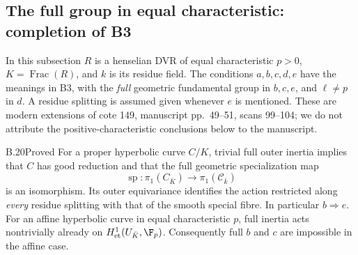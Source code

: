 \subsection{The full group in equal characteristic: completion of B3}

In this subsection $R$ is a henselian DVR of equal characteristic $p>0$,
$K=\operatorname{Frac}(R)$, and $k$ is its residue field. The conditions
$a,b,c,d,e$ have the meanings in B3, with the \emph{full} geometric
fundamental group in $b,c,e$, and $\ell\ne p$ in $d$. A residue splitting
is assumed given whenever $e$ is mentioned. These are modern extensions
of cote 149, manuscript pp.~49--51, scans 99--104; we do not attribute
the positive-characteristic conclusions below to the manuscript.

\begin{claim}{B.20}{Proved}
For a proper hyperbolic curve $C/K$, trivial full outer inertia implies
that $C$ has good reduction and that the full geometric specialization map
\[
 \operatorname{sp}:\pi_1(C_{\bar K})\longrightarrow
                  \pi_1(\mathcal C_{\bar k})
\]
is an isomorphism. Its outer equivariance identifies the action restricted
along \emph{every} residue splitting with that of the smooth special
fibre. In particular $b\Rightarrow e$.
For an affine hyperbolic curve in equal characteristic $p$, full inertia
acts nontrivially already on $H^1_{\mathrm{et}}(U_{\bar K},\F_p)$.
Consequently full $b$ and $c$ are impossible in the affine case.
\end{claim}
